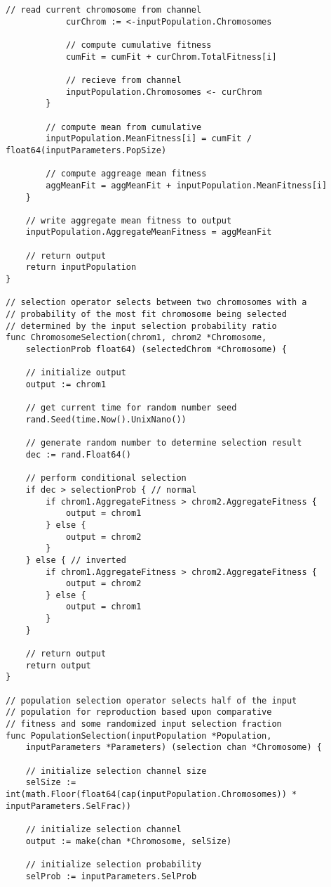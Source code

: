 \begin{lstlisting}[basicstyle=\tiny]
			// read current chromosome from channel
			curChrom := <-inputPopulation.Chromosomes

			// compute cumulative fitness
			cumFit = cumFit + curChrom.TotalFitness[i]

			// recieve from channel
			inputPopulation.Chromosomes <- curChrom
		}

		// compute mean from cumulative
		inputPopulation.MeanFitness[i] = cumFit / float64(inputParameters.PopSize)

		// compute aggreage mean fitness
		aggMeanFit = aggMeanFit + inputPopulation.MeanFitness[i]
	}

	// write aggregate mean fitness to output
	inputPopulation.AggregateMeanFitness = aggMeanFit

	// return output
	return inputPopulation
}

// selection operator selects between two chromosomes with a
// probability of the most fit chromosome being selected
// determined by the input selection probability ratio
func ChromosomeSelection(chrom1, chrom2 *Chromosome, 
    selectionProb float64) (selectedChrom *Chromosome) {

	// initialize output
	output := chrom1

	// get current time for random number seed
	rand.Seed(time.Now().UnixNano())

	// generate random number to determine selection result
	dec := rand.Float64()

	// perform conditional selection
	if dec > selectionProb { // normal
		if chrom1.AggregateFitness > chrom2.AggregateFitness {
			output = chrom1
		} else {
			output = chrom2
		}
	} else { // inverted
		if chrom1.AggregateFitness > chrom2.AggregateFitness {
			output = chrom2
		} else {
			output = chrom1
		}
	}

	// return output
	return output
}

// population selection operator selects half of the input
// population for reproduction based upon comparative
// fitness and some randomized input selection fraction
func PopulationSelection(inputPopulation *Population, 
    inputParameters *Parameters) (selection chan *Chromosome) {

	// initialize selection channel size
	selSize := int(math.Floor(float64(cap(inputPopulation.Chromosomes)) * inputParameters.SelFrac))

	// initialize selection channel
	output := make(chan *Chromosome, selSize)

	// initialize selection probability
	selProb := inputParameters.SelProb


\end{lstlisting}
